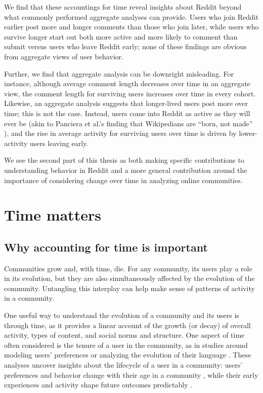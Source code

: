 We find that these accountings for time reveal insights about Reddit beyond what commonly performed aggregate analyses can provide.  Users who join Reddit earlier post more and longer comments than those who join later, while users who survive longer start out both more active and more likely to comment than submit versus users who leave Reddit early; none of these findings are obvious from aggregate views of user behavior.  

Further, we find that aggregate analysis can be downright misleading.  For instance, although average comment length decreases over time in an aggregate view, the comment length for surviving users increases over time in every cohort.  Likewise, an aggregate analysis suggests that longer-lived users post more over time; this is not the case.  Instead, users come into Reddit as active as they will ever be (akin to Panciera et al.'s finding that Wikipedians are ``born, not made'' \cite{Panciera2009}), and the rise in average activity for surviving users over time is driven by lower-activity users leaving early.

We see the second part of this thesis as both making specific contributions to understanding behavior in Reddit and a more general contribution around the importance of considering change over time in analyzing online communities. 

\section{Time matters} 

\subsection{Why accounting for time is important}

Communities grow and, with time, die. For any community, its users play a role in its evolution, but they are also simultaneously affected by the evolution of the community. Untangling this interplay can help make sense of patterns of activity in a community.

One useful way to understand the evolution of a community and its users is through time, as it provides a linear account of the growth (or decay) of overall activity, types of content, and social norms and structure.  One aspect of time often considered is the tenure of a user in the community, as in studies around modeling users' preferences \cite{McAuley2013} or analyzing the evolution of their language \cite{Danescu-niculescu-mizil2013}.  These analyses uncover insights about the lifecycle of a user in a community: users' preferences and behavior change with their age in a community \cite{Panciera2010}, while their early experiences and activity shape future outcomes predictably \cite{Tan2015,Yang2009,Panciera2009, Miller2015}. 

